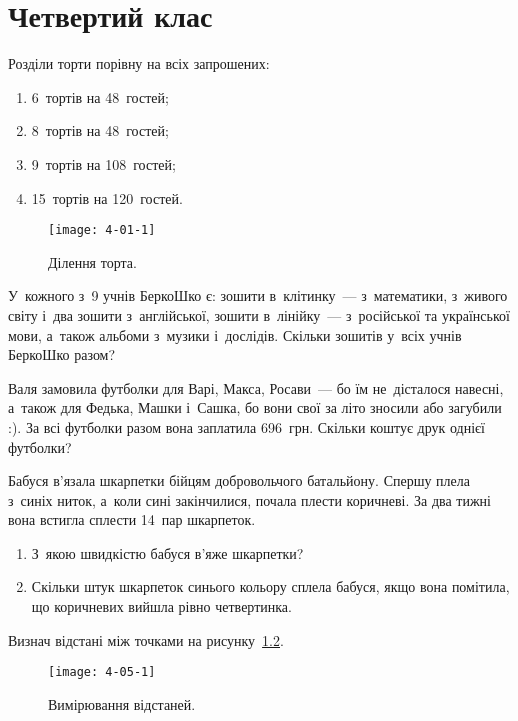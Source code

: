 \chapter{Четвертий клас}

\problem
Розділи торти порівну на всіх запрошених:
\begin{enumerate}
  \item 6~тортів на 48~гостей;
  \item 8~тортів на 48~гостей;
  \item 9~тортів на 108~гостей;
  \item 15~тортів на 120~гостей.
\end{enumerate}

\begin{figure}[ht]
  \centering
  \texttt{[image: 4-01-1]}
  \caption{Ділення торта.}
  \label{fig:cake-division}
\end{figure}


\problem
У~кожного з~9 учнів БеркоШко є: зошити в~клітинку~--- з~математики,
з~живого світу і~два зошити з~англійської, зошити в~лінійку~---
з~російської та української мови, а~також альбоми з~музики і~дослідів.
Скільки зошитів у~всіх учнів БеркоШко разом?


\problem
Валя замовила футболки для Варі, Макса, Росави~--- бо їм не~дісталося навесні,
а~також для Федька, Машки і~Сашка, бо вони свої за літо зносили або загубили :).
За всі футболки разом вона заплатила 696~грн.
Скільки коштує друк однієї футболки? 


\problem
Бабуся в’язала шкарпетки бійцям добровольчого батальйону.
Спершу плела з~синіх ниток, а~коли сині закінчилися, почала плести коричневі.
За два тижні вона встигла сплести 14~пар шкарпеток.
\begin{enumerate}
  \item З~якою швидкістю бабуся в’яже шкарпетки? 
  \item Скільки штук шкарпеток синього кольору сплела бабуся,
  якщо вона помітила, що коричневих вийшла рівно четвертинка.
\end{enumerate}


\problem
Визнач відстані між точками на рисунку~\ref{fig:measure-distance-between-points}.

\begin{figure}[ht]
  \centering
  \texttt{[image: 4-05-1]}
  \caption{Вимірювання відстаней.}
  \label{fig:measure-distance-between-points}
\end{figure}

